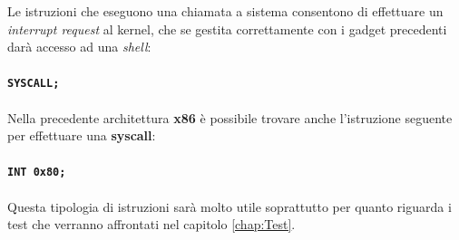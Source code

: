 \begin{itemize}
        Le istruzioni che eseguono una chiamata a sistema consentono di effettuare un \textit{interrupt request} al kernel, che se gestita correttamente con i gadget precedenti darà accesso ad una \textit{shell}:\\
        \\\texttt{\large{\textbf{\textcolor{Bittersweet}{SYSCALL};}}}\\\\
        Nella precedente architettura \textbf{x86} è possibile trovare anche l'istruzione seguente per effettuare una \textbf{syscall}:\\
        \\\texttt{\large{\textbf{\textcolor{Bittersweet}{INT} \space 0x80;}}}\\\\
        Questa tipologia di istruzioni sarà molto utile soprattutto per quanto riguarda i test che verranno affrontati nel capitolo \ref{chap:Test}.\\ 
\end{itemize}

